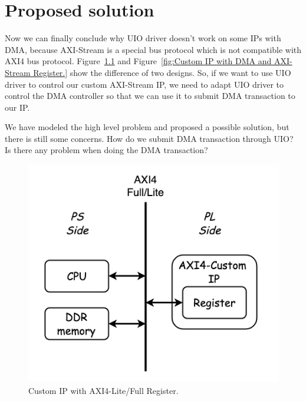 
\chapter{Proposed solution }
\label{cha:proposed solution }
Now we can finally conclude why UIO driver doesn't work on some IPs with DMA, because AXI-Stream is a special bus protocol which is not compatible with AXI4 bus protocol. Figure~\ref{fig:Custom IP with AXI4-Lite/Full Register.} and Figure~\ref{fig:Custom IP with DMA and AXI-Stream Register.} show the difference of two designs. So, if we want to use UIO driver to control our custom AXI-Stream IP, we need to adapt UIO driver to control the DMA controller so that we can use it to submit DMA transaction to our IP.

We have modeled the high level problem and proposed a possible solution, but there is still some concerns. How do we submit DMA transaction through UIO? Is there any problem when doing the DMA transaction? 

\begin{figure}[!htb]
  \centering
  \includegraphics[scale=0.3]{images/customAXI4IP.jpg}
  \caption[Custom IP with AXI4-Lite/Full Register.]{Custom IP with AXI4-Lite/Full Register.}
  \label{fig:Custom IP with AXI4-Lite/Full Register.}
\end{figure}

